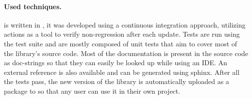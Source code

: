 \paragraph*{Used techniques.}
\pyvmt{} is written in \python{}, it was developed using a continuous integration approach, utilizing \github{} actions as a tool to verify non-regression after each update.
Tests are run using the \pytest{} test suite and are mostly composed of unit tests that aim to cover most of the library's source code.
Most of the documentation is present in the source code as doc-strings so that they can easily be looked up while using an IDE. An external reference is also available and can be generated using sphinx.
After all the tests pass, the new version of the library is automatically uploaded as a package to \pypi{} so that any user can use it in their own project.



